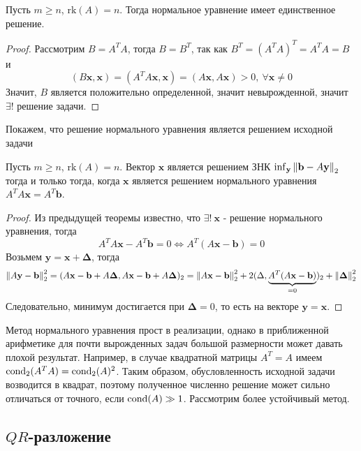 \begin{theorem}[Гаусс К.Ф.]
  Пусть $m\geq n$, $\text{rk}(A)=n$. Тогда нормальное уравнение имеет единственное решение.
\end{theorem}
\begin{proof}
  Рассмотрим $B=A^TA$, тогда $B=B^T$, так как $B^T=(A^TA)^T=A^TA=B$ и
  \[(B\mathbf{x}, \mathbf{x})=(A^TA\mathbf{x}, \mathbf{x})=(A\mathbf{x}, A\mathbf{x})>0,\ \forall \mathbf{x}\neq0\]
  Значит, $B$ является положительно определенной, значит невырожденной, значит $\exists!$
  решение задачи.
\end{proof}
Покажем, что решение нормального уравнения является решением исходной задачи
\begin{theorem}
  Пусть $m\geq n$, $\text{rk}(A)=n$. Вектор $\mathbf{x}$ является решением
  ЗНК $\inf_\mathbf{y}\left\lVert\mathbf{b}-A\mathbf{y}\right\rVert_{2}$ тогда
  и только тогда, когда $\mathbf{x}$ является решением нормального уравнения $A^TA\mathbf{x}=A^T\mathbf{b}$.
\end{theorem}
\begin{proof}
  Из предыдущей теоремы известно, что $\exists!\ \mathbf{x}$ - решение нормального уравнения, тогда
  \[A^TA\mathbf{x}-A^T\mathbf{b}=0\Leftrightarrow A^T(A\mathbf{x}-\mathbf{b})=0\]
  Возьмем $\mathbf{y}=\mathbf{x}+\mathbf{\Delta}$, тогда
  \[\left\lVert A\mathbf{y}-\mathbf{b}\right\rVert^2_2=(A\mathbf{x}-\mathbf{b}+A\mathbf{\Delta},A\mathbf{x}-\mathbf{b}+A\mathbf{\Delta})_2=\left\lVert A\mathbf{x}-\mathbf{b}\right\rVert_2^2+2(\Delta,\underbrace{A^T(A\mathbf{x}-\mathbf{b})}_{=0})_2+\left\lVert\mathbf{\Delta}\right\rVert_2^2\]
  Следовательно, минимум достигается при $\mathbf{\Delta}=0$, то есть на векторе $\mathbf{y}=\mathbf{x}$.
\end{proof}

Метод нормального уравнения прост в реализации, однако в приближенной
арифметике для почти вырожденных задач большой размерности может давать
плохой результат. Например, в случае квадратной матрицы $A^T=A$ имеем
$\operatorname{cond}_2(A^TA)=\operatorname{cond}_2(A)^2$. Таким образом, обусловленность исходной задачи
возводится в квадрат, поэтому полученное численно решение может сильно отличаться от точного,
если $\operatorname{cond}(A)\gg1$. Рассмотрим более устойчивый метод.

\subsection*{$QR$-разложение}

